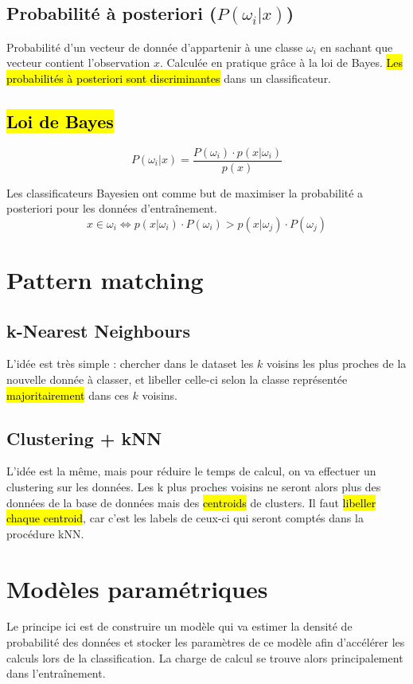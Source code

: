 \documentclass[letterpaper, 12pt]{article}
\newcommand{\alinea}{
\hspace*{0.5cm}}
\begin{document}
		\subsection{Probabilité à posteriori ($P(\omega_i|x)$)}
			\alinea Probabilité d'un vecteur de donnée d'appartenir à une classe $\omega_i$ en sachant que vecteur contient 
				l'observation $x$. Calculée en pratique grâce à la loi de Bayes. \hl{Les probabilités à posteriori sont discriminantes}
				dans un classificateur.
		
		\subsection{\hl{Loi de Bayes}}
			$$P(\omega_i|x) = \frac{P(\omega_i) \cdot p(x|\omega_i)}{p(x)}$$
			\alinea Les classificateurs Bayesien ont comme but de maximiser la probabilité a posteriori pour les données d'entraînement.
				$$ x \in \omega_i \Longleftrightarrow p(x|\omega_i) \cdot P(\omega_i)  >  p(x|\omega_j) \cdot P(\omega_j) $$
	\section{Pattern matching}
		\subsection{k-Nearest Neighbours}
			\alinea L'idée est très simple : chercher dans le dataset les $k$ voisins les plus proches de la nouvelle donnée à classer,
				et libeller celle-ci selon la classe représentée \hl{majoritairement} dans ces $k$ voisins.
		\subsection{Clustering + kNN}
			\alinea L'idée est la même, mais pour réduire le temps de calcul, on va effectuer un clustering sur les données.
				Les k plus proches voisins ne seront alors plus des données de la base de données mais des \hl{centroids} de clusters.
				Il faut \hl{libeller chaque centroid}, car c'est les labels de ceux-ci qui seront comptés dans la procédure kNN.
	\section{Modèles paramétriques}
		\alinea Le principe ici est de construire un modèle qui va estimer la densité de probabilité des données et stocker les
			paramètres de ce modèle afin d'accélérer les calculs lors de la classification. La charge de calcul se trouve alors
			principalement dans l'entraînement.
\end{document}
